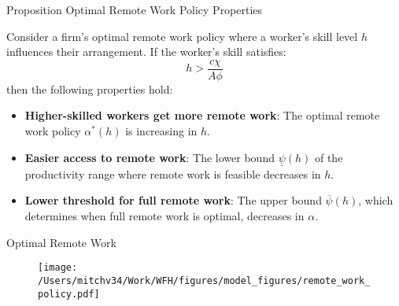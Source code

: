 \documentclass[aspectratio=1610]{beamer}
\begin{document}
\begin{frame}{Proposition Optimal Remote Work Policy Properties}

Consider a firm's optimal remote work policy where a worker's skill level \( h \) influences their arrangement. If the worker's skill satisfies:
$$h > \frac{c \chi}{A \phi}$$
then the following properties hold:\pause
\begin{itemize}
    \item \textbf{Higher-skilled workers get more remote work}: The optimal remote work policy $\alpha^*(h)$ is increasing in $h$. \pause \vspace{0.3cm}
    \item \textbf{Easier access to remote work}: The lower bound $\underline{\psi}(h)$ of the productivity range where remote work is feasible decreases in $h$.\pause \vspace{0.3cm}
    \item \textbf{Lower threshold for full remote work}: The upper bound $\overline{\psi}(h)$, which determines when full remote work is optimal, decreases in $\alpha$.\pause \vspace{0.3cm}
\end{itemize}

\end{frame}

\begin{frame}{Optimal Remote Work}

\begin{figure}
    \centering
    \texttt{[image: /Users/mitchv34/Work/WFH/figures/model\_figures/remote\_work\_policy.pdf]}
    
\end{figure}
    
\end{frame}
\end{document}
